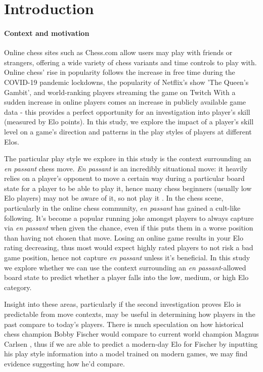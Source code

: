 \documentclass[10pt,a4paper,twocolumn]{article}
\begin{document}
\section{Introduction}

\paragraph{Context and motivation}

Online chess sites such as Chess.com allow users may play with friends or strangers, offering a wide variety of chess variants and time controls to play with. Online chess' rise in popularity follows the increase in free time during the COVID-19 pandemic lockdowns, the popularity of Netflix's show 'The Queen's Gambit', and world-ranking players streaming the game on Twitch \cite{The2020ChessBoom} With a sudden increase in online players comes an increase in publicly available game data - this provides a perfect opportunity for an investigation into player's skill (measured by Elo points). In this study, we explore the impact of a player's skill level on a game's direction and patterns in the play styles of players at different Elos. \newline

The particular play style we explore in this study is the context surrounding an \textit{en passant} chess move. \textit{En passant} is an incredibly situational move: it heavily relies on a player's opponent to move a certain way during a particular board state for a player to be able to play it, hence many chess beginners (usually low Elo players) may not be aware of it, so not play it \cite{EnPassant}. In the chess scene, particularly in the online chess community, \textit{en passant} has gained a cult-like following. It's become a popular running joke amongst players to always capture via \textit{en passant} when given the chance, even if this puts them in a worse position than having not chosen that move. Losing an online game results in your Elo rating decreasing, thus most would expect highly rated players to not risk a bad game position, hence not capture \textit{en passant} unless it's beneficial. In this study we explore whether we can use the context surrounding an \textit{en passant}-allowed board state to predict whether a player falls into the low, medium, or high Elo category. \newline

Insight into these areas, particularly if the second investigation proves Elo is predictable from move contexts, may be useful in determining how players in the past compare to today's players. There is much speculation on how historical chess champion Bobby Fischer would compare to current world champion Magnus Carlsen \cite{BobbyFischerVsMagnusCarlsen}, thus if we are able to predict a modern-day Elo for Fischer by inputting his play style information into a model trained on modern games, we may find evidence suggesting how he'd compare.
\end{document}
